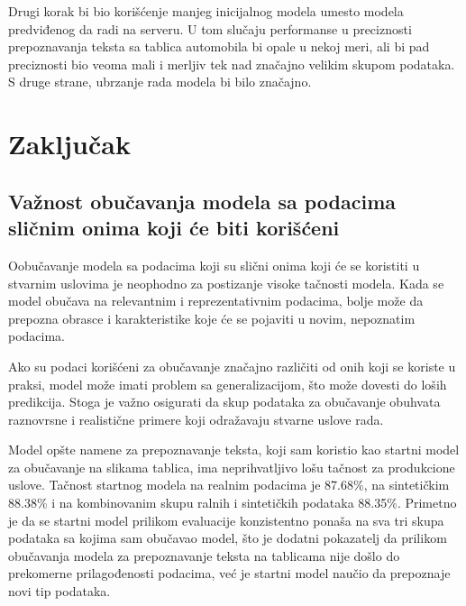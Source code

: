 \documentclass[a4paper,12pt]{article}
\begin{document}
	Drugi korak bi bio korišćenje manjeg inicijalnog modela umesto modela predviđenog da radi na serveru. U tom slučaju performanse u preciznosti prepoznavanja teksta sa tablica automobila bi opale u nekoj meri, ali bi pad preciznosti bio veoma mali i merljiv tek nad značajno velikim skupom podataka. S druge strane, ubrzanje rada modela bi bilo značajno.
	\newpage
	
	\section{Zaključak}
	
	\subsection{Važnost obučavanja modela sa podacima sličnim onima koji će biti korišćeni}
	Oobučavanje modela sa podacima koji su slični onima koji će se koristiti u stvarnim uslovima je neophodno za postizanje visoke tačnosti modela. Kada se model obučava na relevantnim i reprezentativnim podacima, bolje može da prepozna obrasce i karakteristike koje će se pojaviti u novim, nepoznatim podacima.
	
	Ako su podaci korišćeni za obučavanje značajno različiti od onih koji se koriste u praksi, model može imati problem sa generalizacijom, što može dovesti do loših predikcija. Stoga je važno osigurati da skup podataka za obučavanje obuhvata raznovrsne i realistične primere koji odražavaju stvarne uslove rada.
	
	Model opšte namene za prepoznavanje teksta, koji sam koristio kao startni model za obučavanje na slikama tablica, ima neprihvatljivo lošu tačnost za produkcione uslove. Tačnost startnog modela na realnim podacima je 87.68\%, na sintetičkim 88.38\% i na kombinovanim skupu ralnih i sintetičkih podataka 88.35\%. Primetno je da se startni model prilikom evaluacije konzistentno ponaša na sva tri skupa podataka sa kojima sam obučavao model, što je dodatni pokazatelj da prilikom obučavanja modela za prepoznavanje teksta na tablicama nije došlo do prekomerne prilagođenosti podacima, već je startni model naučio da prepoznaje novi tip podataka.
	\newpage
	
	\printbibliography
\end{document}
